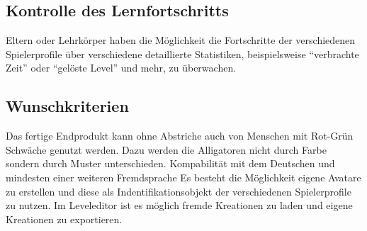 \subsection{Kontrolle des Lernfortschritts}

\begin{requirements}
	Eltern oder Lehrkörper haben die Möglichkeit die Fortschritte der verschiedenen Spielerprofile über verschiedene detaillierte Statistiken, beispielsweise ``verbrachte Zeit'' oder ``gelöste Level'' und mehr,  zu überwachen.
\end{requirements}

\subsection{Wunschkriterien}

\begin{requirements}
	Das fertige Endprodukt kann ohne Abstriche auch von Menschen mit Rot-Grün Schwäche genutzt werden. Dazu werden die Alligatoren nicht durch Farbe sondern durch Muster unterschieden.
	Kompabilität mit dem Deutschen und mindesten einer weiteren Fremdsprache
	Es besteht die Möglichkeit eigene Avatare zu erstellen und diese als Indentifikationsobjekt der verschiedenen Spielerprofile zu nutzen.
	Im Leveleditor ist es möglich fremde Kreationen zu laden und eigene Kreationen zu exportieren.
\end{requirements}
